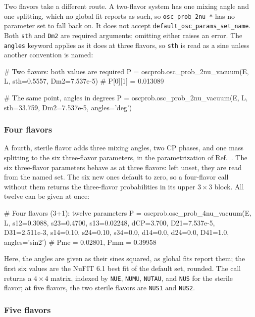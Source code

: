 Two flavors take a different route. A two-flavor system has one mixing angle and one splitting, which no global fit reports as such, so {\tt osc\_prob\_2nu\_*} has no parameter set to fall back on. It does not accept {\tt default\_osc\_params\_set\_name}. Both {\tt sth} and {\tt Dm2} are required arguments; omitting either raises an error. The {\tt angles} keyword applies as it does at three flavors, so {\tt sth} is read as a sine unless another convention is named:
\begin{pysnip}
# Two flavors: both values are required
P = oscprob.osc_prob_2nu_vacuum(E, L,
 sth=0.5557, Dm2=7.537e-5)
# P[0][1] = 0.013089

# The same point, angles in degrees
P = oscprob.osc_prob_2nu_vacuum(E, L,
 sth=33.759, Dm2=7.537e-5, angles='deg')
\end{pysnip}


\subsubsection{Four flavors}
\label{sec:four_flavors}

A fourth, sterile flavor adds three mixing angles, two CP phases, and one mass splitting to the six three-flavor parameters, in the parametrization of Ref.~\cite{Kopp:2011qd}. The six three-flavor parameters behave as at three flavors: left unset, they are read from the named set. The six new ones default to zero, so a four-flavor call without them returns the three-flavor probabilities in its upper $3 \times 3$ block. All twelve can be given at once:
\begin{pysnip}
# Four flavors (3+1): twelve parameters
P = oscprob.osc_prob_4nu_vacuum(E, L,
 s12=0.3088, s23=0.4700, s13=0.02248,
 dCP=3.700, D21=7.537e-5, D31=2.511e-3,
 s14=0.10, s24=0.10, s34=0.0,
 d14=0.0, d24=0.0, D41=1.0,
 angles='sin2')
# Pme = 0.02801, Pmm = 0.39958
\end{pysnip}
Here, the angles are given as their sines squared, as global fits report them; the first six values are the NuFIT 6.1 best fit of the default set, rounded. The call returns a $4 \times 4$ matrix, indexed by {\tt NUE}, {\tt NUMU}, {\tt NUTAU}, and {\tt NUS} for the sterile flavor; at five flavors, the two sterile flavors are {\tt NUS1} and {\tt NUS2}.


\subsubsection{Five flavors}
\label{sec:five_flavors}

